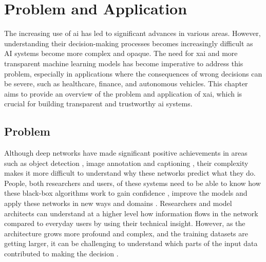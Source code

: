 \label{sec:2_problem_and_application}
\section{Problem and Application}

The increasing use of \gls{ai} has led to significant advances in various areas. However, understanding their decision-making processes becomes increasingly difficult as AI systems become more complex and opaque. 
The need for \gls{xai} and more transparent machine learning models has become imperative to address this problem, especially in applications where the consequences of wrong decisions can be severe, such as healthcare, finance, and autonomous vehicles. This chapter aims to provide an overview of the problem and application of \gls{xai}, which is crucial for building transparent and trustworthy \gls{ai} systems.


\subsection{Problem}

Although deep networks have made significant positive achievements in areas such as object detection \cite{girshickRichFeatureHierarchies2014, renFasterRCNNRealTime2015, redmonYouOnlyLook2016, linFocalLossDense2017}, image annotation and captioning \cite{vinyalsShowTellNeural2015, karpathyDeepVisualSemanticAlignments2015, johnsonDenseCapFullyConvolutional2016, tranRichImageCaptioning2016}, their complexity makes it more difficult to understand why these networks predict what they do. People, both researchers and users, of these systems need to be able to know how these black-box algorithms work to gain confidence \cite{koehlerExplanationImaginationConfidence1991, herlockerExplainingCollaborativeFiltering2000, dzindoletRoleTrustAutomation2003}, improve the models and apply these networks in new ways and domains \cite{jiangArtificialIntelligenceHealthcare2017, tonekaboniWhatCliniciansWant2019, holzingerCausabilityExplainabilityArtificial2019, guptaDeepLearningObject2021, tjoaSurveyExplainableArtificial2021}. Researchers and model architects can understand at a higher level how information flows in the network compared to everyday users by using their technical insight. However, as the architecture grows more profound and complex, and the training datasets are getting larger, it can be challenging to understand which parts of the input data contributed to making the decision \cite{sagirogluBigDataReview2013}.


